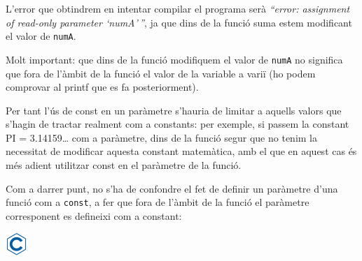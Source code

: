 \documentclass[]{book}
\newenvironment{Shaded}{\begin{snugshade}}{\end{snugshade}}
\newcommand{\DataTypeTok}[1]{\textcolor[rgb]{0.13,0.29,0.53}{#1}}
\newcommand{\DecValTok}[1]{\textcolor[rgb]{0.00,0.00,0.81}{#1}}
\newcommand{\SpecialCharTok}[1]{\textcolor[rgb]{0.00,0.00,0.00}{#1}}
\newcommand{\StringTok}[1]{\textcolor[rgb]{0.31,0.60,0.02}{#1}}
\newcommand{\ImportTok}[1]{#1}
\newcommand{\CommentTok}[1]{\textcolor[rgb]{0.56,0.35,0.01}{\textit{#1}}}
\newcommand{\ControlFlowTok}[1]{\textcolor[rgb]{0.13,0.29,0.53}{\textbf{#1}}}
\newcommand{\PreprocessorTok}[1]{\textcolor[rgb]{0.56,0.35,0.01}{\textit{#1}}}
\newcommand{\NormalTok}[1]{#1}
\begin{document}
L'error que obtindrem en intentar compilar el programa serà
\emph{``error: assignment of read-only parameter `numA'\,''}, ja que
dins de la funció suma estem modificant el valor de \texttt{numA}.

Molt important: que dins de la funció modifiquem el valor de
\texttt{numA} no significa que fora de l'àmbit de la funció el valor de
la variable a variï (ho podem comprovar al printf que es fa
posteriorment).

Per tant l'ús de const en un paràmetre s'hauria de limitar a aquells
valors que s'hagin de tractar realment com a constants: per exemple, si
passem la constant PI = 3.14159\ldots{} com a paràmetre, dins de la
funció segur que no tenim la necessitat de modificar aquesta constant
matemàtica, amb el que en aquest cas és més adient utilitzar const en el
paràmetre de la funció.

Com a darrer punt, no s'ha de confondre el fet de definir un paràmetre
d'una funció com a \texttt{const}, a fer que fora de l'àmbit de la
funció el paràmetre corresponent es defineixi com a constant:

\includegraphics{./img/c.png}

\begin{Shaded}
\end{Shaded}
\end{document}
